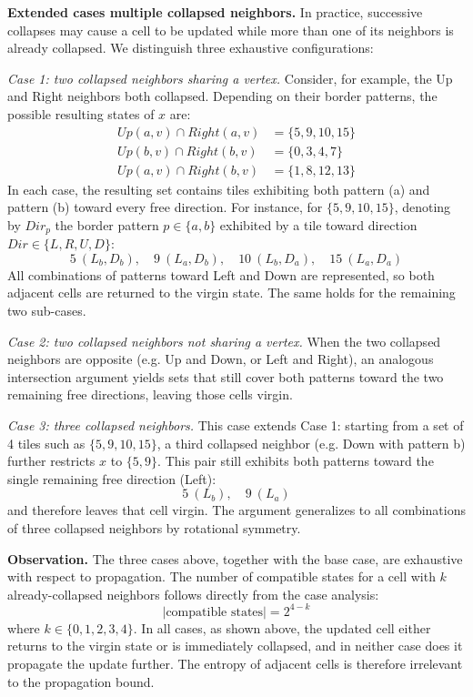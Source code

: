 \textbf{Extended cases multiple collapsed neighbors.}
In practice, successive collapses may cause a cell to be updated while more
than one of its neighbors is already collapsed. We distinguish three
exhaustive configurations:

\textit{Case 1: two collapsed neighbors sharing a vertex.}
Consider, for example, the Up and Right neighbors both collapsed. Depending
on their border patterns, the possible resulting states of $x$ are:
\begin{align*}
    Up(a,v) \cap Right(a,v) &= \{5, 9, 10, 15\} \\
    Up(b,v) \cap Right(b,v) &= \{0, 3, 4, 7\}  \\
    Up(a,v) \cap Right(b,v) &= \{1, 8, 12, 13\}
\end{align*}
In each case, the resulting set contains tiles exhibiting both pattern (a) and
pattern (b) toward every free direction. For instance, for $\{5, 9, 10, 15\}$,
denoting by $Dir_p$ the border pattern $p \in \{a, b\}$ exhibited by a tile
toward direction $Dir \in \{L, R, U, D\}$:
\[
    5\ (L_b, D_b),\quad 9\ (L_a, D_b),\quad 10\ (L_b, D_a),\quad 15\ (L_a, D_a)
\]
All combinations of patterns toward Left and Down are represented, so both
adjacent cells are returned to the virgin state. The same holds for the
remaining two sub-cases.

\textit{Case 2: two collapsed neighbors not sharing a vertex.}
When the two collapsed neighbors are opposite (e.g. Up and Down, or Left and
Right), an analogous intersection argument yields sets that still cover both
patterns toward the two remaining free directions, leaving those cells virgin.

\textit{Case 3: three collapsed neighbors.}
This case extends Case 1: starting from a set of 4 tiles such as
$\{5, 9, 10, 15\}$, a third collapsed neighbor (e.g. Down with pattern b)
further restricts $x$ to $\{5, 9\}$. This pair still exhibits both patterns
toward the single remaining free direction (Left):
\[
    5\ (L_b),\quad 9\ (L_a)
\]
and therefore leaves that cell virgin. The argument generalizes to all
combinations of three collapsed neighbors by rotational symmetry.


\textbf{Observation.}
The three cases above, together with the base case, are exhaustive with respect
to propagation. The number of compatible states for a cell with $k$
already-collapsed neighbors follows directly from the case analysis:
\[
    |\text{compatible states}| = 2^{4 - k}
\]
where $k \in \{0, 1, 2, 3, 4\}$. In all cases, as shown above, the updated
cell either returns to the virgin state or is immediately collapsed, and in
neither case does it propagate the update further. The entropy of adjacent
cells is therefore irrelevant to the propagation bound.

